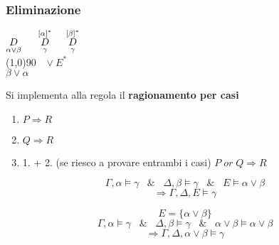 \documentclass{article}
\theoremstyle{break}
\theoremstyle{break}
\theoremstyle{break}
\theoremstyle{break}
\begin{document}
\subsubsection{Eliminazione}
\begin{center}
    \( \underset{\alpha \vee \beta}{D} \hspace{0.5cm} \stackrel{[\alpha]^*}{\underset{\gamma}{D}} \hspace{0.5cm} \stackrel{[\beta]^*}{\underset{\gamma}{D}} \)\\
    \hspace{0.9cm}\line(1,0){90}\(\;\;\; \vee E^* \)\\  
    \( \beta \vee \alpha \)
\end{center}
Si implementa alla regola il \textbf{ragionamento per casi}
\begin{enumerate}
    \item \( P \Rightarrow R \) 
    \item \( Q \Rightarrow R \) 
    \item 1. + 2. (se riesco a provare entrambi i casi) \( P\;or\;Q \Rightarrow R \) 
\end{enumerate}
\begin{example}
    \[
        \Gamma,\alpha \models \gamma\;\;\; \&\;\;\; \Delta,\beta \models \gamma\;\;\; \&\;\;\; E \models \alpha \vee \beta
    \]
    \[
    \Rightarrow \Gamma,\Delta,E \models \gamma
    \] 
\end{example}
\begin{example}
    \[
    E = \{\alpha \vee \beta\} 
    \] 
    \[
        \Gamma,\alpha \models \gamma\;\;\; \&\;\;\; \Delta,\beta \models \gamma\;\;\; \& \;\;\; \alpha \vee \beta \models \alpha \vee \beta
    \] 
    \[
    \Rightarrow \Gamma,\Delta,\alpha \vee \beta \models \gamma
    \] 
\end{example}
\end{document}
